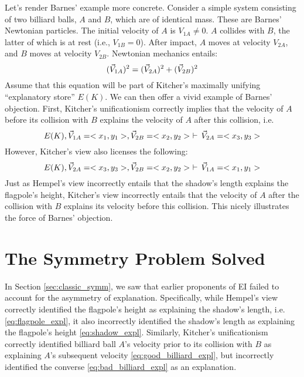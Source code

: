 \documentclass{svjour3}                     %
\renewcommand\vec{\mathaccent"017E}
\begin{document}
Let's render Barnes' example more concrete. Consider a simple system consisting of two billiard balls, $A$ and $B$, which are of identical mass. These are Barnes' Newtonian particles. The initial velocity of $A$ is $V_{1A} \neq 0$. $A$ collides with $B$, the latter of which is at rest (i.e., $V_{1B} = 0$). After impact, $A$ moves at velocity $V_{2A}$, and $B$ moves at velocity $V_{2B}$. Newtonian mechanics entails:
\begin{equation} \label{eq:newtonian}
	(\vec V_{1A})^{2} = (\vec V_{2A})^{2} + (\vec V_{2B})^{2}
\end{equation}
Assume that this equation will be part of Kitcher's maximally unifying ``explanatory store'' $E(K)$. We can then offer a vivid example of Barnes' objection. First, Kitcher's unificationism correctly implies that the velocity of $A$ before its collision with $B$ explains the velocity of $A$ after this collision, i.e.
\begin{equation} \label{eq:good_billiard_expl}
	E(K), \vec V_{1A} = <x_1, y_1>, \vec V_{2B} = <x_2, y_2> \,\,\vdash \, \vec V_{2A} = <x_3, y_3>
\end{equation}
However, Kitcher's view also licenses the following:
\begin{equation} \label{eq:bad_billiard_expl}
	E(K), \vec V_{2A} = <x_3, y_3>, \vec V_{2B} = <x_2, y_2> \,\,\vdash\, \vec V_{1A} = <x_1, y_1>
\end{equation}
Just as Hempel's view incorrectly entails that the shadow's length explains the flagpole's height, Kitcher's view incorrectly entails that the velocity of $A$ after the collision with $B$ explains its velocity before this collision. This nicely illustrates the force of Barnes' objection.






\section{The Symmetry Problem Solved}
\label{symm_solution}

In Section \ref{sec:classic_symm}, we saw that earlier proponents of EI failed to account for the asymmetry of explanation. Specifically, while Hempel's view correctly identified the flagpole's height as explaining the shadow's length, i.e. \eqref{eq:flagpole_expl}, it also incorrectly identified the shadow's length as explaining the flagpole's height \eqref{eq:shadow_expl}. Similarly, Kitcher's unificationism correctly identified billiard ball $A$'s velocity prior to its collision with $B$ as explaining $A$'s subsequent velocity \eqref{eq:good_billiard_expl}, but incorrectly identified the converse \eqref{eq:bad_billiard_expl} as an explanation.
\end{document}
